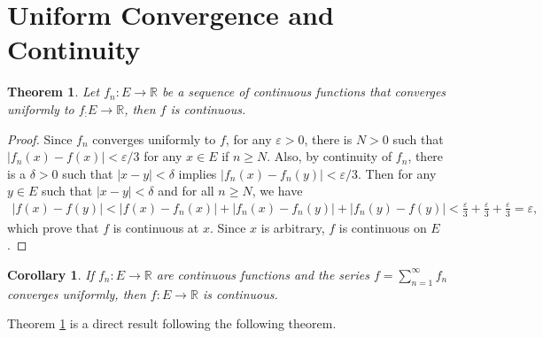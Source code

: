\documentclass[10pt]{book}
\newtheorem{theorem}{Theorem}[chapter]
\newtheorem{corollary}{Corollary}[theorem]
\theoremstyle{definition}
\numberwithin{equation}{chapter}
\begin{document}
\medskip







\section{Uniform Convergence and Continuity}

\begin{theorem}\label{th_63}
Let $f_n: E \to \mathbb{R}$ be a sequence of continuous functions that converges uniformly to $f_: E \to \mathbb{R}$, then $f$ is continuous.
\end{theorem}
\begin{proof}
Since $f_n$ converges uniformly to $f$, for any $\varepsilon > 0$, there is $N > 0$ such that $\left|f_n(x) - f(x)\right| < \varepsilon/3$ for any $x \in E$ if $n \geq N$. Also, by continuity of $f_n$, there is a $\delta > 0$ such that $\left|x - y\right| < \delta$ implies $\left|f_n(x) - f_n(y)\right| < \varepsilon/3$. Then for any $y \in E$ such that $\left|x - y\right| < \delta$ and for all $n \geq N$, we have
\begin{align*}
    \left|f(x) - f(y)\right| < \left|f(x) - f_n(x)\right| + \left|f_n(x) - f_n(y)\right| + \left|f_n(y) - f(y)\right| < \frac{\varepsilon}{3} + \frac{\varepsilon}{3} + \frac{\varepsilon}{3} = \varepsilon,
\end{align*}
which prove that $f$ is continuous at $x$. Since $x$ is arbitrary, $f$ is continuous on $E$.
\end{proof}

\medskip


\begin{corollary}\label{coro_631}
If $f_n: E \to \mathbb{R}$ are continuous functions and the series $f = \sum^\infty_{n=1} f_n$ converges uniformly, then $f: E \to \mathbb{R}$ is continuous.
\end{corollary}

\medskip

Theorem \ref{th_63} is a direct result following the following theorem.

\medskip
\end{document}

